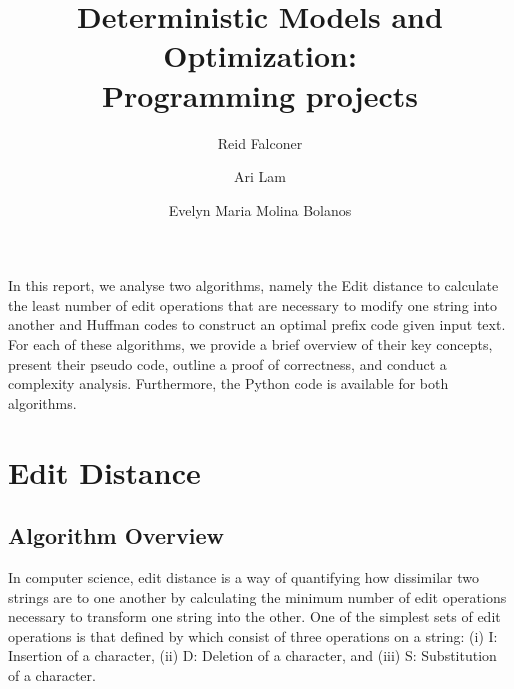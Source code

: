 \documentclass[12pt, authoryear]{elsarticle}
\begin{document}
\begin{frontmatter}  %

\title{Deterministic Models and Optimization: \\ \vspace{0.5cm} \large Programming projects}

\author[Add1]{Reid Falconer}

\author[Add1]{Ari Lam}

\author[Add1]{Evelyn Maria Molina Bolanos }

\address[Add1]{Barcelona Graduate School of Economics, Barcelona, Spain}




\end{frontmatter}

In this report, we analyse two algorithms, namely the Edit distance to calculate the least number of edit operations that are necessary to modify one string into another and Huffman codes to construct an optimal prefix code given input text. For each of these algorithms, we provide a brief overview of their key concepts, present their pseudo code, outline a proof of correctness, and conduct a complexity analysis. Furthermore, the Python code is available for both algorithms.

\section{Edit Distance}

\subsection{Algorithm Overview}

In computer science, edit distance is a way of quantifying how dissimilar two strings are to one another by calculating the minimum number of edit operations necessary to transform one string into the other. One of the simplest sets of edit operations is that defined by \cite{levenshtein1966binary} which consist of three operations on a string: (i) I: Insertion of a character, (ii) D: Deletion of a character, and (iii) S: Substitution of a character.
\end{document}

